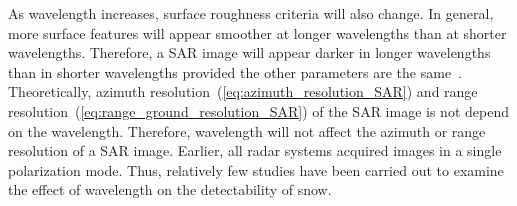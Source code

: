 \begin{description}
	As wavelength increases, surface roughness criteria will also change. In general, more surface features will appear smoother at longer wavelengths than at shorter wavelengths. Therefore, a SAR image will appear darker in longer wavelengths than in shorter wavelengths provided the other parameters are the same~\citep{xia1997understanding}. Theoretically, azimuth resolution~(\ref{eq:azimuth_resolution_SAR}) and range resolution~(\ref{eq:range_ground_resolution_SAR}) of the SAR image is not depend on the wavelength. Therefore, wavelength will not affect the azimuth or range resolution of a SAR image. Earlier, all radar systems acquired images in a single polarization mode. Thus, relatively few studies have been carried out to examine the effect of wavelength on the detectability of snow. 
	\end{description}

